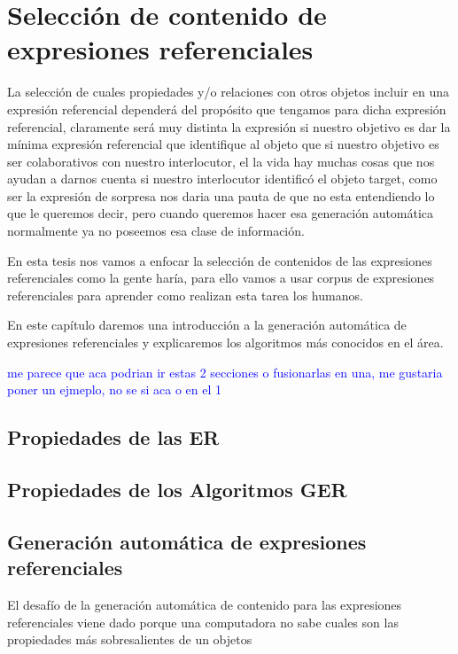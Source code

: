 \chapter{Selecci\'on de contenido de expresiones referenciales}
\label{sec:seleccion}

La selecci\'on de cuales propiedades y/o relaciones con otros objetos incluir en una expresi\'on referencial depender\'a del prop\'osito que tengamos para dicha expresi\'on referencial, claramente ser\'a muy distinta la expresi\'on si nuestro objetivo es dar la m\'inima expresi\'on referencial que identifique al objeto que si nuestro objetivo es ser colaborativos con nuestro interlocutor, el la vida hay muchas cosas que nos ayudan a darnos cuenta si nuestro interlocutor identific\'o el objeto target, como ser la expresi\'on de sorpresa nos daria una pauta de que no esta entendiendo lo que le queremos decir, pero cuando queremos hacer esa generaci\'on autom\'atica normalmente ya no poseemos esa clase de informaci\'on.

En esta tesis nos vamos a enfocar la selecci\'on de contenidos de las expresiones referenciales como la gente har\'ia, para ello vamos a usar corpus de expresiones referenciales para aprender como realizan esta tarea los humanos.

En este cap\'itulo daremos una introducci\'on a la generaci\'on autom\'atica de expresiones referenciales y explicaremos los algoritmos m\'as conocidos en el \'area.


\textcolor{blue}{me parece que aca podrian ir estas 2 secciones o fusionarlas en una, me gustaria poner un ejmeplo, no se si aca o en el 1}

\section{Propiedades de las ER}

\section{Propiedades de los Algoritmos GER}


\section{Generaci\'on autom\'atica de expresiones referenciales}

El desaf\'io de la generaci\'on autom\'atica de contenido para las expresiones referenciales viene dado porque una computadora no sabe cuales son las propiedades m\'as sobresalientes de un objetos

